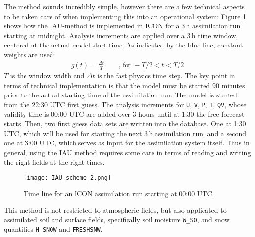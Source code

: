 The method sounds incredibly simple, however there are a few technical aspects to be taken care of when implementing this into an operational 
system: Figure \ref{fig_IAU_scheme} shows how the IAU-method is implemented in ICON for a $3\,\mathrm{h}$ assimilation run starting at midnight. 
Analysis increments are applied over a $3\,\mathrm{h}$ time window, centered at the actual model start time. As indicated by the blue line, constant 
weights are used:
\begin{align}
 g(t) = \frac{\Delta t}{T}\qquad \text{, for } -T/2 < t < T/2
\end{align}
$T$ is the window width and $\Delta t$ is the fast physics time step. The key point in terms of technical implementation is that the model 
must be started $90$ minutes prior to the actual starting time of the assimilation run. The model is started from the 22:30 UTC first guess. 
The analysis increments for \texttt{U}, \texttt{V}, \texttt{P}, \texttt{T}, \texttt{QV}, whose validity time is 00:00 UTC are added over 
$3$ hours until at 1:30 the free forecast starts. Then, two first guess data sets are written into the database. One at 1:30 UTC, which will 
be used for starting the next $3\,\mathrm{h}$ assimilation run, and a second one at 3:00 UTC, which serves as input for the assimilation system 
itself. Thus in general, using the IAU method requires some care in terms of reading and writing the right fields at the right times.
\begin{figure}[hbt]
 \centering
 \texttt{[image: IAU\_scheme\_2.png]}
 \caption{Time line for an ICON assimilation run starting at 00:00 UTC.}\label{fig_IAU_scheme}
\end{figure}

This method is not restricted to atmospheric fields, but also applicated to
assimilated soil and surface fields, specifically soil moisture
\texttt{W\_SO}, and snow quantities \texttt{H\_SNOW} and \texttt{FRESHSNW}.
